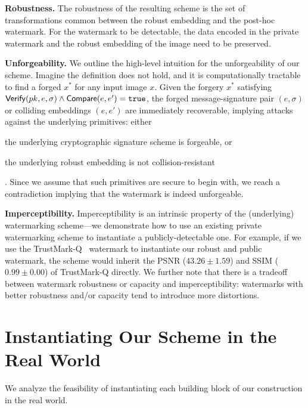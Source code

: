 \documentclass[12pt]{article}
\begin{document}
\textbf{Robustness.} The robustness of the resulting scheme is the set of transformations common between the robust embedding and the post-hoc watermark.
For the watermark to be detectable, the data encoded in the private watermark and the robust embedding of the image need to be preserved.

\textbf{Unforgeability.} We outline the high-level intuition for the unforgeability of our scheme.
Imagine the definition does not hold, and it is computationally tractable to find a forged $x^*$ for any input image $x$.
Given the forgery $x^*$ satisfying $\mathsf{Verify}(pk, e, \sigma) \land \mathsf{Compare}(e, e') = \mathtt{true}$, the forged message-signature pair $(e, \sigma)$ or colliding embeddings $(e, e')$ are immediately recoverable, implying attacks against the underlying primitives: either
\begin{enumerate*}[label=(\alph*)]
  \item the underlying cryptographic signature scheme is forgeable, or
  \item the underlying robust embedding is not collision-resistant
\end{enumerate*}.
Since we assume that such primitives are secure to begin with, we reach a contradiction implying that the watermark is indeed unforgeable.

\textbf{Imperceptibility.} Imperceptibility is an intrinsic property of the (underlying) watermarking scheme---we demonstrate how to use an existing private watermarking scheme to instantiate a publicly-detectable one. 
For example, if we use the TrustMark-Q~\citep{bui2023trustmark} watermark to instantiate our robust and public watermark, the scheme would inherit the PSNR ($43.26 \pm 1.59$) and SSIM ($0.99 \pm 0.00$) of TrustMark-Q directly. 
We further note that there is a tradeoff between watermark robustness or capacity and imperceptibility: watermarks with better robustness and/or capacity tend to introduce more distortions.

\section{Instantiating Our Scheme in the Real World}\label{sec:barriers}

We analyze the feasibility of instantiating each building block of our construction in the real world.
\end{document}
